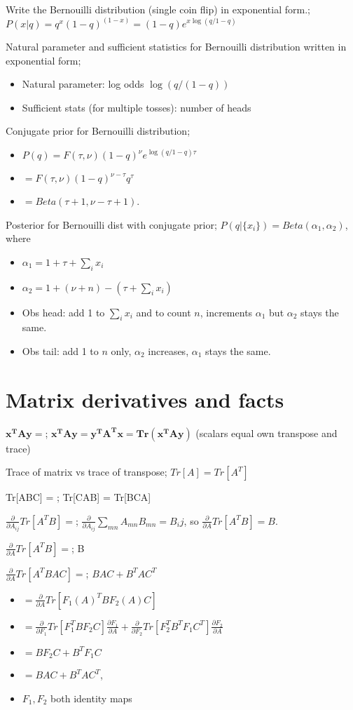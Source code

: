 \documentclass{article}
\begin{document}
Write the Bernouilli distribution (single coin flip) in exponential form.; $P(x|q) = q^x(1-q)^{(1-x)} = (1-q)e^{x\log(q/1-q)}$

Natural parameter and sufficient statistics for Bernouilli distribution written in exponential form; \begin{itemize} \item Natural parameter: log odds $\log (q/(1-q))$ \item Sufficient stats (for multiple tosses): number of heads \end{itemize}

Conjugate prior for Bernouilli distribution; \begin{itemize} \item $P(q)=F(\tau, \nu)(1-q)^{\nu}e^{\log(q/1-q)\tau}$ \item $=F(\tau, \nu)(1-q)^{\nu-\tau}q^{\tau}$ \item $= Beta(\tau+1, \nu-\tau+1)$.  \end{itemize}

Posterior for Bernouilli dist with conjugate prior; $P(q|\{x_i\}) = Beta(\alpha_1, \alpha_2)$, where \begin{itemize} \item $\alpha_1 = 1+\tau+\sum_i x_i$ \item $\alpha_2 = 1+(\nu+n) - (\tau+\sum_i x_i)$ \item Obs head: add 1 to $\sum_i x_i$ and to count $n$, increments $\alpha_1$ but $\alpha_2$ stays the same.  \item Obs tail: add 1 to $n$ only, $\alpha_2$ increases, $\alpha_1$ stays the same.  \end{itemize}

\section{Matrix derivatives and facts}

$\mathbf{x^TAy}=$; $\mathbf{x^TAy}=\mathbf{y^TA^Tx=Tr(x^TAy)}$ (scalars equal own transpose and trace)

Trace of matrix vs trace of transpose; $Tr[A] = Tr[A^T]$

Tr[ABC] = ; Tr[CAB] = Tr[BCA]

$\frac{\partial}{\partial A_{ij}}Tr[A^TB] =$; $\frac{\partial}{\partial A_{ij}}\sum_{mn}A_{mn}B_{mn} = B_ij$, so $\frac{\partial}{\partial A}Tr[A^TB] = B$.

$\frac{\partial}{\partial A}Tr[A^TB] = $; B

$\frac{\partial}{\partial A}Tr[A^TBAC] =$; $BAC+B^TAC^T$ \begin{itemize} \item $=\frac{\partial}{\partial A}Tr[F_1(A)^TBF_2(A)C]$ \item $= \frac{\partial}{\partial F_1}Tr[F_1^TBF_2C]\frac{\partial F_1}{\partial A} + \frac{\partial}{\partial F_2}Tr[F_2^TB^TF_1C^T]\frac{\partial F_2}{\partial A}$ \item $= BF_2C+B^TF_1C$ \item $= BAC+B^TAC^T$, \item $F_1, F_2$ both identity maps \end{itemize} 
\end{document}
